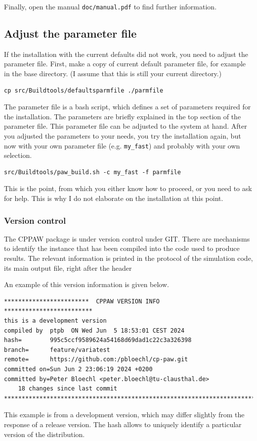 \documentclass[final,12pt,makeidx,DIV=calc]{article}
\begin{document}
{{{{{{Finally, open the manual \verb|doc/manual.pdf| to find further
information.

\subsection{Adjust the parameter file}
If the installation with the current defaults did not work, you need
to adjust the parameter file. First,  make a copy of
current default parameter file, for example in the base directory. (I
assume that this is still your current directory.)
\begin{verbatim}
cp src/Buildtools/defaultsparmfile ./parmfile
\end{verbatim}

The parameter file is a bash script, which defines a set of parameters
required for the installation. The parameters are briefly explained in
the top section of the parameter file. This parameter file can be
adjusted to the system at hand.  After you adjusted the
parameters to your needs, you try the installation again, but now with
your own parameter file (e.g. \verb|my_fast|) and probably with your
own selection.
\begin{verbatim}
src/Buildtools/paw_build.sh -c my_fast -f parmfile
\end{verbatim}

This is the point, from which you either know how to proceed, or you
need to ask for help. This is why I do not elaborate on the
installation at this point.



\subsubsection{Version control}
The CPPAW package is under version control under GIT. There are
mechanisms to identify the instance that has been compiled into the
code used to produce results. The relevant information is printed in
the protocol of the simulation code, its main output file, right after
the header

An example of this version information is given below.
{\footnotesize
\begin{verbatim}
************************  CPPAW VERSION INFO  *************************
this is a development version
compiled by  ptpb  ON Wed Jun  5 18:53:01 CEST 2024
hash=        995c5ccf9589624a54168d69dad1c22c3a326398
branch=      feature/variatest
remote=      https://github.com:/pbloechl/cp-paw.git
committed on=Sun Jun 2 23:06:19 2024 +0200
committed by=Peter Bloechl <peter.bloechl@tu-clausthal.de>
    18 changes since last commit
***********************************************************************
\end{verbatim}
}
This example is from a development version, which may differ slightly
from the response of a release version. The hash allows to uniquely
identify a particular version of the distribution.

}}}}}}
\end{document}
